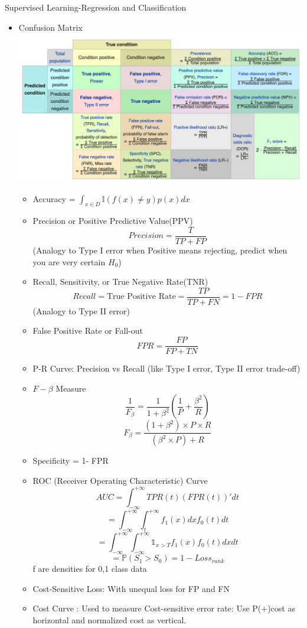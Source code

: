 \documentclass[11pt, openany]{book}              %
\begin{document}
Supervised Learning-Regression and Classification
\begin{itemize}
    \item Confusion Matrix
    \includegraphics[width=14cm]{ConfusionMatrix.png}
    
    \begin{itemize}
    	\item Accuracy = $\int_{x\in D} \mathbb{I}(f(x)\neq y) p(x)dx$
    	\item Precision or Positive Predictive Value(PPV)$$Precision = \frac{T}{TP+FP}$$ (Analogy to Type I error when Positive means rejecting, predict when you are very certain $H_0$) 
    	\item Recall, Sensitivity, or True Negative Rate(TNR)$$Recall = \text{True Positive Rate}= \frac{TP}{TP+FN} = 1 - FPR$$(Analogy to Type II error)
    	\item False Positive Rate or Fall-out $$FPR = \frac{FP}{FP+TN}$$
    	\item P-R Curve: Precision vs Recall (like Type I error, Type II error trade-off)
    	\item $F-\beta$ Measure
    	$$\frac{1}{F_{\beta}} = \frac{1}{1+\beta^2}(\frac{1}{P}+\frac{\beta^2}{R})$$
    	$${F_{\beta}} = \frac{(1+\beta^2) \times P \times R}{(\beta^2 \times P) + R}$$
    	\item Specificity = 1- FPR
    	\item ROC (Receiver Operating Characteristic) Curve
    	$$AUC = \int_{-\infty}^{+\infty}  TPR(t)(FPR(t))'dt$$
    	$$ = \int_{-\infty}^{+\infty} \int_{t}^{+\infty} f_1(x)dxf_0(t)dt$$
    	$$ = \int_{-\infty}^{+\infty}\int_{-\infty}^{+\infty} \mathbb{1}_{x>T} f_1(x) f_0(t)dxdt$$
    	$$ = \mathbb{P}(S_1 > S_0) = 1-Loss_{rank}$$ f are densities for 0,1 class data
    	\item Cost-Sensitive Loss: With unequal loss for FP and FN
    	\item Cost Curve : Used to measure Cost-sensitive error rate: Use P(+)cost as horizontal and normalized cost as vertical. 
    	
    \end{itemize}
\end{itemize}
\end{document}
